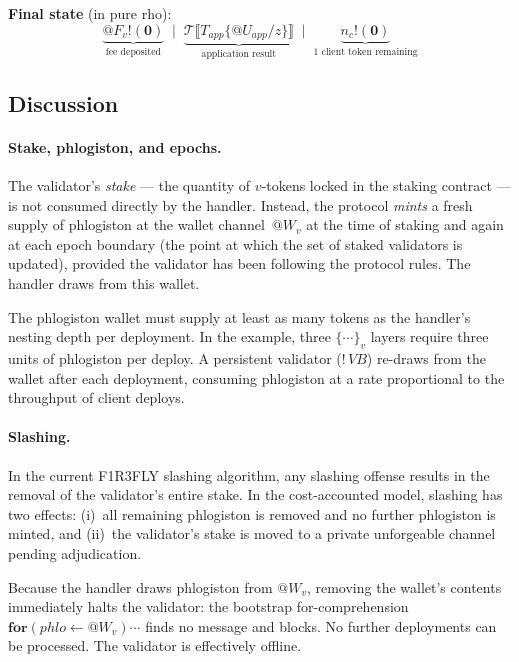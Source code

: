 \documentclass[11pt,a4paper]{article}
\makeatletter
\newcommand{\lsem}{\llbracket}
\newcommand{\rsem}{\rrbracket}
\newcommand{\Par}{\mathbin{|}}
\newcommand{\forc}{\mathbf{for}}
\newcommand{\send}[2]{#1 !\!\left( #2 \right)}
\newcommand{\recv}[3]{\forc\!\left( #1 \leftarrow #2 \right) #3}
\newcommand{\nil}{\mathbf{0}}
\newcommand{\quot}[1]{@#1}
\newcommand{\subst}[3]{#1\{#2 / #3\}}
\newcommand{\signed}[2]{\{#1\}_{#2}}
\makeatother
\begin{document}
\noindent
\textbf{Final state} (in pure rho):
\[
  \underbrace{
    \send{\quot{F_v}}{\nil}
  }_{\text{fee deposited}}
  \;\Par\;
  \underbrace{
    \mathcal{T}\lsem
      \subst{T_{\mathit{app}}}
        {\quot{U_{\mathit{app}}}}{z}
    \rsem
  }_{\text{application result}}
  \;\Par\;
  \underbrace{
    \send{n_c}{\nil}
  }_{\text{1 client token remaining}}
\]

\subsection{Discussion}
\label{app:ex-discussion}

\paragraph{Stake, phlogiston, and epochs.}
The validator's \emph{stake} --- the quantity of $v$-tokens
locked in the staking contract --- is not consumed directly
by the handler.  Instead, the protocol \emph{mints} a fresh
supply of phlogiston at the wallet channel~$\quot{W_v}$ at
the time of staking and again at each epoch boundary (the
point at which the set of staked validators is updated),
provided the validator has been following the protocol rules.
The handler draws from this wallet.

The phlogiston wallet must supply at least as many
tokens as the handler's nesting depth per deployment.  In the
example, three $\signed{\cdots}{v}$ layers require three
units of phlogiston per deploy.  A persistent validator
($!\,\mathit{VB}$) re-draws from the wallet after each
deployment, consuming phlogiston at a rate proportional
to the throughput of client deploys.

\paragraph{Slashing.}
In the current F1R3FLY slashing algorithm, any slashing
offense results in the removal of the validator's entire
stake.  In the cost-accounted model, slashing has two
effects: (i)~all remaining phlogiston is removed and no
further phlogiston is minted, and (ii)~the validator's stake
is moved to a private unforgeable channel pending
adjudication.

Because the handler draws phlogiston from
$\quot{W_v}$, removing the wallet's contents
immediately halts the validator: the bootstrap
for-comprehension $\recv{\mathit{phlo}}{\quot{W_v}}{\cdots}$
finds no message and blocks.  No further deployments can be
processed.  The validator is effectively offline.
\end{document}
